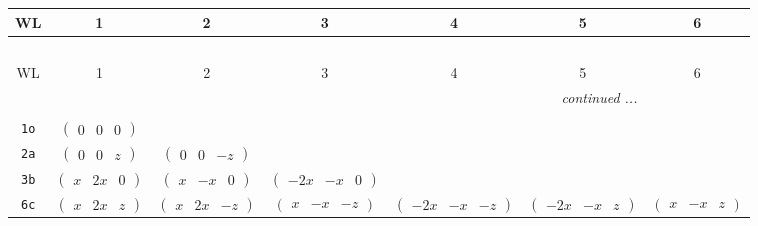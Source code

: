 \documentclass[fleqn,9pt,landscape]{jsarticle}
\begin{document}
\begin{center}
\renewcommand{\arraystretch}{1.2}
\begin{longtable}{ccccccc}
 \hline \hline
WL & 1 & 2 & 3 & 4 & 5 & 6 \\ \hline \endfirsthead

\multicolumn{6}{l}{\tablename\ \thetable{}} \\
 \hline \hline
WL & 1 & 2 & 3 & 4 & 5 & 6 \\ \hline \endhead

 \hline \hline
\multicolumn{6}{r}{\footnotesize\it continued ...} \\ \endfoot

 \hline \hline
\multicolumn{6}{r}{} \\ \endlastfoot

{\tt 1o} & $ \begin{pmatrix} 0 & 0 & 0 \end{pmatrix} $ & $  $ & $  $ & $  $ & $  $ & $  $ \\ \hline
{\tt 2a} & $ \begin{pmatrix} 0 & 0 & z \end{pmatrix} $ & $ \begin{pmatrix} 0 & 0 & - z \end{pmatrix} $ & $  $ & $  $ & $  $ & $  $ \\ \hline
{\tt 3b} & $ \begin{pmatrix} x & 2 x & 0 \end{pmatrix} $ & $ \begin{pmatrix} x & - x & 0 \end{pmatrix} $ & $ \begin{pmatrix} - 2 x & - x & 0 \end{pmatrix} $ & $  $ & $  $ & $  $ \\ \hline
{\tt 6c} & $ \begin{pmatrix} x & 2 x & z \end{pmatrix} $ & $ \begin{pmatrix} x & 2 x & - z \end{pmatrix} $ & $ \begin{pmatrix} x & - x & - z \end{pmatrix} $ & $ \begin{pmatrix} - 2 x & - x & - z \end{pmatrix} $ & $ \begin{pmatrix} - 2 x & - x & z \end{pmatrix} $ & $ \begin{pmatrix} x & - x & z \end{pmatrix} $ \\ \hline

\end{longtable}
\end{center}
\end{document}
